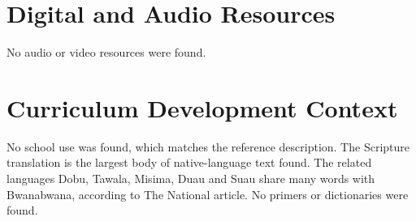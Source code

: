 \documentclass[12pt]{article}
\begin{document}
\section{Digital and Audio Resources}
No audio or video resources were found.

\section{Curriculum Development Context}
No school use was found, which matches the reference description. The Scripture translation is the largest body of native-language text found. The related languages Dobu, Tawala, Misima, Duau and Suau share many words with Bwanabwana, according to The National article. No primers or dictionaries were found.
\end{document}

